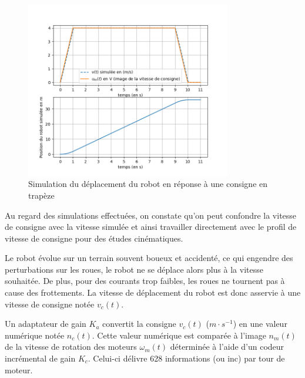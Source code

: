 

\begin{figure}[!htb]
\begin{center}
\includegraphics[width=0.8\textwidth]{images/figure5.png}
\caption{Simulation du déplacement du robot en réponse à une consigne en trapèze  \label{fig5}}
\end{center}
\end{figure}



Au regard des simulations effectuées, on constate qu'on peut confondre
la vitesse de consigne avec la vitesse simulée et ainsi travailler
directement avec le profil de vitesse de consigne pour des études
cinématiques.

Le robot évolue sur un terrain souvent boueux et accidenté, ce qui
engendre des perturbations sur les roues, le robot ne se déplace alors
plus à la vitesse souhaitée. De plus, pour des courants trop faibles,
les roues ne tournent pas à cause des frottements. La vitesse de
déplacement du robot est donc asservie à une vitesse de consigne notée
\(v_{c}(t)\).


Un adaptateur de gain $K_{a}$ convertit la consigne \(v_{c}(t)\) ($m\cdot s^{-1}$) en une valeur numérique notée $n_c(t)$.
Cette valeur numérique est comparée à l'image $n_m(t)$ de la vitesse de rotation des moteurs \(\omega_{m}\left( t \right)\)
déterminée à l'aide d'un codeur incrémental de gain $K_c$. Celui-ci délivre 628 informations (ou inc) par tour de moteur.



